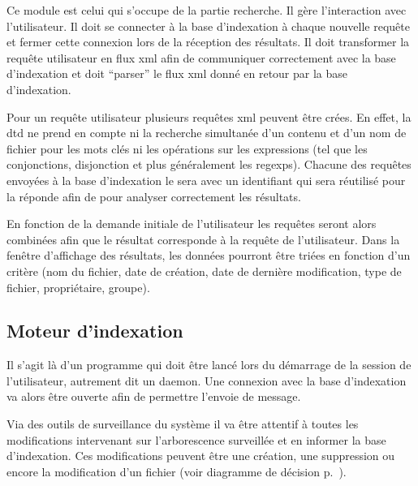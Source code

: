 \documentclass[a4paper,12pt]{report}
\begin{document}
Ce module est celui qui s'occupe de la partie recherche. Il gère l'interaction avec l'utilisateur. Il doit se connecter à la base d'indexation à chaque nouvelle requête et fermer cette connexion lors de la réception des résultats. Il doit transformer la requête utilisateur en flux \gls{xml} afin de communiquer correctement avec la base d'indexation et doit \enquote{\gls{parser}} le flux \gls{xml} donné  en retour par la base d'indexation.

Pour un requête utilisateur plusieurs requêtes \gls{xml} peuvent être crées. En effet, la \gls{dtd} ne prend en compte ni la recherche simultanée d'un contenu et d'un nom de \gls{fichier} pour les mots clés ni les opérations sur les expressions (tel que les conjonctions, disjonction et plus généralement les \glspl{regexp}). Chacune des requêtes envoyées à la base d'indexation le sera avec un identifiant qui sera réutilisé pour la réponde afin de pour analyser correctement les résultats.

En fonction de la demande initiale de l'utilisateur les requêtes seront alors combinées afin que le résultat corresponde à la requête de l'utilisateur. Dans la fenêtre d'affichage des résultats, les données pourront être triées en fonction d'un critère (nom du \gls{fichier}, date de création, date de dernière modification, type de \gls{fichier}, propriétaire, groupe).

\subsection{Moteur d'indexation}
Il s'agit là d'un programme qui doit être lancé lors du démarrage de la session de l'utilisateur, autrement dit un \gls{daemon}. Une connexion avec la base d'indexation va alors être ouverte afin de permettre l'envoie de message.

Via des outils de surveillance du système il va être attentif à toutes les modifications intervenant sur l'\gls{arborescence} surveillée et en informer la base d'indexation. Ces modifications peuvent être une création, une suppression ou encore la modification d'un \gls{fichier} (voir diagramme de décision p.~\pageref{decision-daemon}).
\end{document}
